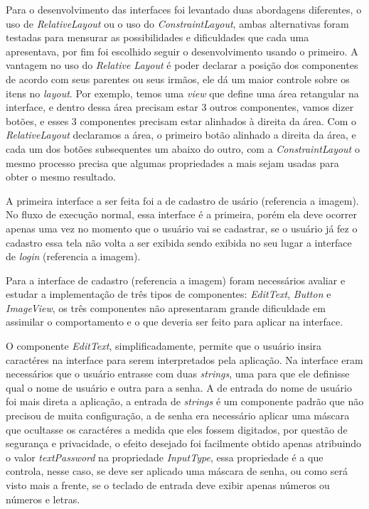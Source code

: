 \documentclass[hidelinks,12pt]{article}
\begin{document}
Para o desenvolvimento das interfaces foi levantado duas abordagens diferentes, o uso de \textit{RelativeLayout} ou o uso do \textit{ConstraintLayout}, ambas alternativas foram testadas para mensurar as possibilidades e dificuldades que cada uma apresentava, por fim foi escolhido seguir o desenvolvimento usando o primeiro. A vantagem no uso do \textit{Relative Layout} \'e poder declarar a posi\c{c}\~ao dos componentes de acordo com seus parentes ou seus irm\~aos, ele d\'a um maior controle sobre os itens no \textit{layout}. Por exemplo, temos uma \textit{view} que define uma \'area retangular na interface, e dentro dessa \'area precisam estar 3 outros componentes, vamos dizer bot\~oes, e esses 3 componentes precisam estar alinhados à direita da \'area. Com o \textit{RelativeLayout} declaramos a \'area, o primeiro bot\~ao alinhado a direita da \'area, e cada um dos bot\~oes subsequentes um abaixo do outro, com a \textit{ConstraintLayout} o mesmo processo precisa que algumas propriedades a mais sejam usadas para obter o mesmo resultado.

A primeira interface a ser feita foi a de cadastro de us\'ario (referencia a imagem). No fluxo de execu\c{c}\~ao normal, essa interface \'e a primeira, por\'em ela deve ocorrer apenas uma vez no momento que o usu\'ario vai se cadastrar, se o usu\'ario j\'a fez o cadastro essa tela n\~ao volta a ser exibida sendo exibida no seu lugar a interface de \textit{login} (referencia a imagem).

Para a interface de cadastro (referencia a imagem) foram necess\'arios avaliar e estudar a implementa\c{c}\~ao de três tipos de componentes: \textit{EditText}, \textit{Button} e \textit{ImageView}, os três componentes n\~ao apresentaram grande dificuldade em assimilar o comportamento e o que deveria ser feito para aplicar na interface.

O componente \textit{EditText}, simplificadamente, permite que o usu\'ario insira caract\'eres na interface para serem interpretados pela aplica\c{c}\~ao. Na interface eram necess\'arios que o usu\'ario entrasse com duas \textit{strings}, uma para que ele definisse qual o nome de usu\'ario e outra para a senha. A de entrada do nome de usu\'ario foi mais direta a aplica\c{c}\~ao, a entrada de \textit{strings} \'e um componente padr\~ao que n\~ao precisou de muita configura\c{c}\~ao, a de senha era necess\'ario aplicar uma m\'ascara que ocultasse os caract\'eres a medida que eles fossem digitados, por quest\~ao de seguran\c{c}a e privacidade, o efeito desejado foi facilmente obtido apenas atribuindo o valor \textit{textPassword} na propriedade \textit{InputType}, essa propriedade \'e a que controla, nesse caso, se deve ser aplicado uma m\'ascara de senha, ou como ser\'a visto mais a frente, se o teclado de entrada deve exibir apenas n\'umeros ou n\'umeros e letras.
\end{document}
